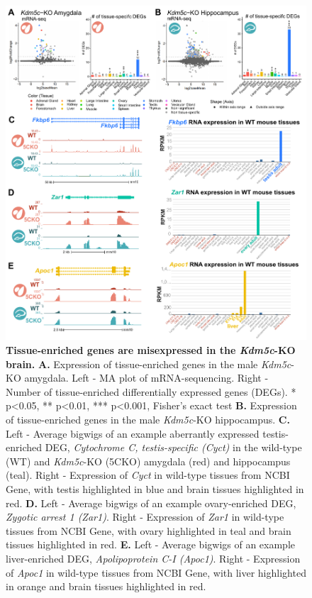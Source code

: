 \documentclass[
]{article}
\begin{document}
\begin{figure}
  \centering 
  \includegraphics{../submission/compiled_figs/Brain_tissue_genes.pdf}
  \caption[Tissue-enriched genes are misexpressed in the \textit{Kdm5c}-KO brain]{\textbf{Tissue-enriched genes are misexpressed in the \textit{Kdm5c}-KO brain.} \textbf{A.} Expression of tissue-enriched genes in the male \textit{Kdm5c}-KO amygdala. Left - MA plot of mRNA-sequencing. Right - Number of tissue-enriched differentially expressed genes (DEGs). * p<0.05, ** p<0.01, *** p<0.001, Fisher's exact test \textbf{B.} Expression of tissue-enriched genes in the male \textit{Kdm5c}-KO hippocampus. \textbf{C.} Left - Average bigwigs of an example aberrantly expressed testis-enriched DEG, \textit{Cytochrome C, testis-specific (Cyct)} in the wild-type (WT) and \textit{Kdm5c}-KO (5CKO) amygdala (red) and hippocampus (teal). Right - Expression of \textit{Cyct} in wild-type tissues from NCBI Gene, with testis highlighted in blue and brain tissues highlighted in red. \textbf{D.} Left - Average bigwigs of an example ovary-enriched DEG, \textit{Zygotic arrest 1 (Zar1)}. Right - Expression of \textit{Zar1} in wild-type tissues from NCBI Gene, with ovary highlighted in teal and brain tissues highlighted in red. \textbf{E.} Left - Average bigwigs of an example liver-enriched DEG, \textit{Apolipoprotein C-I (Apoc1)}. Right - Expression of \textit{Apoc1} in wild-type tissues from NCBI Gene, with liver highlighted in orange and brain tissues highlighted in red.}
  \label{figurelabel}
\end{figure}
\end{document}
